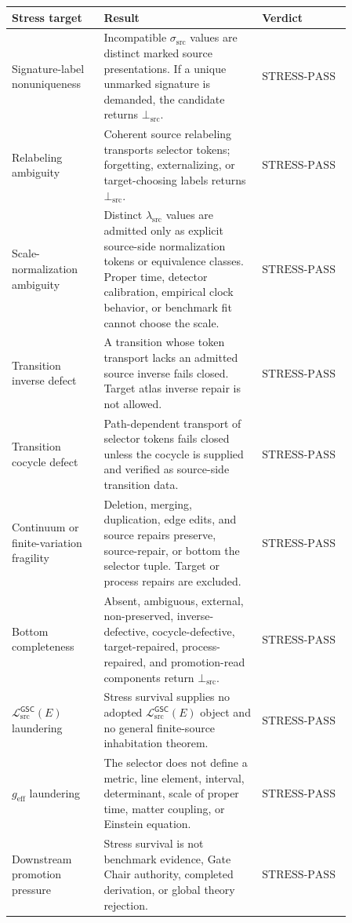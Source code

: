 \documentclass[11pt]{article}
\newcommand{\MetricData}{\mathcal{L}_{\mathrm{src}}^{\mathsf{GSC}}}
\newcommand{\geff}{g_{\mathrm{eff}}}
\newcommand{\SigTok}{\sigma_{\mathrm{src}}}
\newcommand{\ScaleTok}{\lambda_{\mathrm{src}}}
\newcommand{\BottomSrc}{\bot_{\mathrm{src}}}
\newcommand{\StressPass}{\mathrm{STRESS\mbox{-}PASS}}
\begin{document}
\begin{longtable}{p{0.25\linewidth}p{0.43\linewidth}p{0.18\linewidth}}
\toprule
Stress target & Result & Verdict \\
\midrule
Signature-label nonuniqueness & Incompatible \(\SigTok\) values are distinct
marked source presentations. If a unique unmarked signature is demanded, the
candidate returns \(\BottomSrc\). & \(\StressPass\) \\
Relabeling ambiguity & Coherent source relabeling transports selector tokens;
forgetting, externalizing, or target-choosing labels returns \(\BottomSrc\). &
\(\StressPass\) \\
Scale-normalization ambiguity & Distinct \(\ScaleTok\) values are admitted only
as explicit source-side normalization tokens or equivalence classes. Proper
time, detector calibration, empirical clock behavior, or benchmark fit cannot
choose the scale. & \(\StressPass\) \\
Transition inverse defect & A transition whose token transport lacks an
admitted source inverse fails closed. Target atlas inverse repair is not
allowed. & \(\StressPass\) \\
Transition cocycle defect & Path-dependent transport of selector tokens fails
closed unless the cocycle is supplied and verified as source-side transition
data. & \(\StressPass\) \\
Continuum or finite-variation fragility & Deletion, merging, duplication, edge
edits, and source repairs preserve, source-repair, or bottom the selector
tuple. Target or process repairs are excluded. & \(\StressPass\) \\
Bottom completeness & Absent, ambiguous, external, non-preserved,
inverse-defective, cocycle-defective, target-repaired, process-repaired, and
promotion-read components return \(\BottomSrc\). & \(\StressPass\) \\
\(\MetricData(E)\) laundering & Stress survival supplies no adopted
\(\MetricData(E)\) object and no general finite-source inhabitation theorem. &
\(\StressPass\) \\
\(\geff\) laundering & The selector does not define a metric, line element,
interval, determinant, scale of proper time, matter coupling, or Einstein
equation. & \(\StressPass\) \\
Downstream promotion pressure & Stress survival is not benchmark evidence,
Gate Chair authority, completed derivation, or global theory rejection. &
\(\StressPass\) \\
\bottomrule
\end{longtable}
\end{document}
